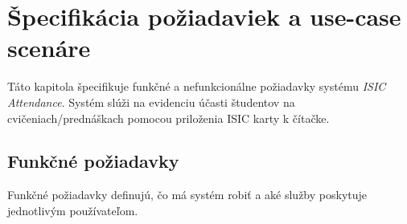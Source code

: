 \chapter{Špecifikácia požiadaviek a use-case scenáre}
\label{chap:requirements-usecases}

Táto kapitola špecifikuje funkčné a nefunkcionálne požiadavky systému \textit{ISIC Attendance}. Systém slúži na evidenciu účasti študentov na cvičeniach/prednáškach pomocou priloženia ISIC karty k čítačke.

\section{Funkčné požiadavky}
\label{sec:functional-requirements}

Funkčné požiadavky definujú, čo má systém robiť a aké služby poskytuje jednotlivým používateľom.

